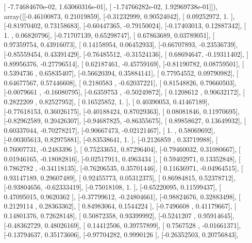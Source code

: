\documentclass{article}
\begin{document}
       [ -7.74684670e-02,   1.63060316e-01],
       [ -1.74766282e-02,   1.92969738e-01]]), array([[-0.46100873,  0.21019859],
       [-0.31232999,  0.90524042],
       [ 0.09252972,  1.        ],
       [-0.81970402,  0.73158683],
       [-0.60447365, -0.79150024],
       [-0.17403013,  0.12887342],
       [ 1.        ,  0.06820796],
       [-0.71707139,  0.65298747],
       [ 0.67863689,  0.03789051],
       [ 0.97359754,  0.43916073],
       [ 0.14158954,  0.06452933],
       [-0.66707893, -0.23536739],
       [-0.85559454,  0.43391429],
       [-0.76485512, -0.31524136],
       [ 0.68694647, -0.19311402],
       [ 0.89956376, -0.27796514],
       [ 0.62187461, -0.45759169],
       [-0.81190782,  0.08759501],
       [ 0.5394736 ,  0.65835407],
       [-0.56620394,  0.35884141],
       [ 0.77954552,  0.09790982],
       [ 0.64677567,  0.57446608],
       [ 0.2180583 , -0.62037221],
       [ 0.81548826,  0.79660503],
       [-0.0079661 , -0.16080795],
       [-0.6359753 , -0.50249872],
       [ 0.1208612 ,  0.90632172],
       [ 0.2822209 ,  0.82527952],
       [ 0.16525852,  1.        ],
       [ 0.40390053,  0.41467189],
       [-0.77618153,  0.36026175],
       [-0.40188424,  0.87029363],
       [ 0.08081846,  0.11970695],
       [-0.82962589,  0.20426307],
       [-0.94687825, -0.86355675],
       [ 0.89858627,  0.13649932],
       [ 0.60337044, -0.70278217],
       [-0.90667473, -0.02121467],
       [ 1.        ,  0.58069692],
       [-0.00305613,  0.82975881],
       [-0.83538641,  1.        ],
       [-0.2126859 ,  0.33719988],
       [ 0.76007731, -0.2483396 ],
       [ 0.75233651,  0.87296404],
       [-0.79460032,  0.31080667],
       [ 0.01946165, -0.18082816],
       [-0.02517911,  0.4963434 ],
       [ 0.59402971,  0.13352848],
       [ 0.7862782 , -0.34118135],
       [-0.76206535,  0.35701446],
       [ 0.11636971, -0.04964515],
       [ 0.93147189,  0.29607489],
       [ 0.92455773,  0.05312375],
       [ 0.86984815,  0.52378712],
       [-0.93804656, -0.62333419],
       [-0.75018108,  1.        ],
       [-0.65220095,  0.11599437],
       [ 0.47095015,  0.9620362 ],
       [-0.37799612, -0.24804661],
       [-0.98824676,  0.32883498],
       [ 0.2129114 ,  0.28363362],
       [ 0.84983064,  0.1544224 ],
       [-0.7496608 ,  0.41179667],
       [ 0.14801376,  0.72628148],
       [ 0.50872358,  0.93399992],
       [-0.5241207 ,  0.95914645],
       [-0.48362729,  0.48026169],
       [ 0.14412506,  0.39757899],
       [ 0.7567528 , -0.01661371],
       [-0.13794637,  0.35173606],
       [-0.97704282,  0.9990126 ],
       [-0.26352503,  0.20756843],
\end{document}
